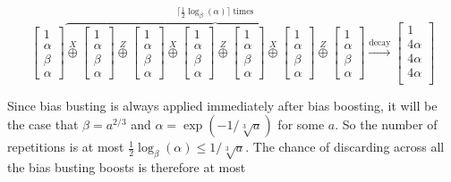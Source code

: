 \documentclass[onecolumn,unpublished,a4paper]{quantumarticle}
\theoremstyle{definition}
\theoremstyle{definition}
\theoremstyle{definition}
\begin{document}
\begin{equation}
\begin{bmatrix}1\\\alpha\\\beta\\\alpha\end{bmatrix}
\overbrace{
\stackrel{X}{\oplus}
\begin{bmatrix}1\\\alpha\\\beta\\\alpha\end{bmatrix}
\stackrel{Z}{\oplus}
\begin{bmatrix}1\\\alpha\\\beta\\\alpha\end{bmatrix}
\stackrel{X}{\oplus}
\begin{bmatrix}1\\\alpha\\\beta\\\alpha\end{bmatrix}
\stackrel{Z}{\oplus}
\begin{bmatrix}1\\\alpha\\\beta\\\alpha\end{bmatrix}
\stackrel{X}{\oplus}
\begin{bmatrix}1\\\alpha\\\beta\\\alpha\end{bmatrix}
\stackrel{Z}{\oplus}
\begin{bmatrix}1\\\alpha\\\beta\\\alpha\end{bmatrix}
}^{\lceil \frac{1}{2}\log_\beta(\alpha) \rceil\;\text{times}}
\xrightarrow{\text{decay}}
\begin{bmatrix}
1\\
4\alpha\\
4\alpha\\
4\alpha\\
\end{bmatrix}
\end{equation}

Since bias busting is always applied immediately after bias boosting, it will be the case that $\beta = a^{2/3}$ and $\alpha = \exp(-1/\sqrt[3]{a})$ for some $a$.
So the number of repetitions is at most $\frac{1}{2}\log_\beta(\alpha) \leq 1/\sqrt[3]{a}$.
The chance of discarding across all the bias busting boosts is therefore at most
\end{document}
